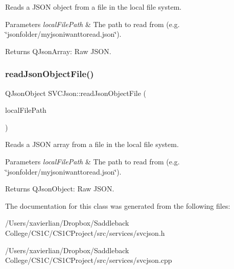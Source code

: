 Reads a J\+S\+ON object from a file in the local file system. 


\begin{DoxyParams}{Parameters}
{\em local\+File\+Path} & The path to read from (e.\+g. \char`\"{}jsonfolder/myjsoniwanttoread.\+json\char`\"{}). \\
\hline
\end{DoxyParams}
\begin{DoxyReturn}{Returns}
Q\+Json\+Array\+: Raw J\+S\+ON. 
\end{DoxyReturn}
\mbox{\label{class_s_v_c_json_aacff71253cc41cb2a403cf2226038962}} 
\subsubsection{\texorpdfstring{readJsonObjectFile()}{readJsonObjectFile()}}
{\footnotesize\ttfamily Q\+Json\+Object S\+V\+C\+Json\+::read\+Json\+Object\+File (\begin{DoxyParamCaption}\item[{Q\+String}]{local\+File\+Path }\end{DoxyParamCaption})}



Reads a J\+S\+ON array from a file in the local file system. 


\begin{DoxyParams}{Parameters}
{\em local\+File\+Path} & The path to read from (e.\+g. \char`\"{}jsonfolder/myjsoniwanttoread.\+json\char`\"{}). \\
\hline
\end{DoxyParams}
\begin{DoxyReturn}{Returns}
Q\+Json\+Object\+: Raw J\+S\+ON. 
\end{DoxyReturn}


The documentation for this class was generated from the following files\+:\begin{DoxyCompactItemize}
\item 
/\+Users/xavierlian/\+Dropbox/\+Saddleback College/\+C\+S1\+C/\+C\+S1\+C\+Project/src/services/svcjson.\+h\item 
/\+Users/xavierlian/\+Dropbox/\+Saddleback College/\+C\+S1\+C/\+C\+S1\+C\+Project/src/services/svcjson.\+cpp\end{DoxyCompactItemize}
